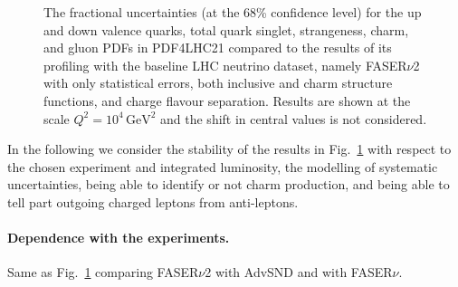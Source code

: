 \begin{figure}[t]
\caption{The fractional uncertainties (at the 68\% confidence level)
for the up and down valence quarks, total quark singlet, strangeness, charm, and gluon PDFs
in PDF4LHC21 compared to the results of its profiling with the baseline LHC neutrino dataset, namely
FASER$\nu$2 with only statistical errors, both inclusive and charm structure functions, and charge flavour
separation.
%
Results are shown at the scale $Q^2 = 10^4 \, \textrm{GeV}^2$ and the shift in central values
is not considered.}
\label{fig:profiling_baseline}
\end{figure}

In the following we consider the stability of the results in Fig.~\ref{fig:profiling_baseline}
with respect to the chosen experiment and integrated luminosity, the modelling of systematic
uncertainties, being able to identify or not charm production, and being able to tell part outgoing
charged leptons from anti-leptons.

\paragraph{Dependence with the experiments.}
%
Same as Fig.~\ref{fig:profiling_baseline} comparing FASER$\nu$2 with AdvSND and with FASER$\nu$.

